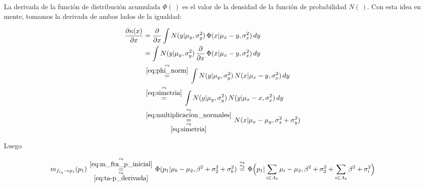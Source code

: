 \documentclass[article]{jss}
\newcommand\hfrac[2]{\genfrac{}{}{0pt}{}{#1}{#2}} %
\begin{document}
\begin{appendix}
La derivada de la funci\'on de distribuci\'on acumulada $\Phi(\,)$ es el valor de la densidad de la funci\'on de probabilidad $N(\,)$. Con esta idea en mente, tomamos la derivada de ambos lados de la igualdad:

\begin{equation}\label{eq:ta-p_derivada}
\begin{split}
\frac{\partial\kappa(x)}{\partial x} &= \frac{\partial}{\partial x} \int  N(y| \mu_y, \sigma_y^2 ) \,   \Phi (x | \mu_x -y , \sigma_x^2 ) \, dy \\
&= \int  N(y| \mu_y, \sigma_y^2 ) \, \frac{\partial}{\partial x} \,\Phi (x| \mu_x - y, \sigma_x^2 )  \, dy   \\
& \overset{\hfrac{\text{eq}}{\ref{eq:phi_norm}}}{=} \int  N(y| \mu_y, \sigma_y^2 ) \, N(x| \mu_x -y , \sigma_x^2)  \, dy  \\
& \overset{\hfrac{\text{eq}}{\ref{eq:simetria}}}{=} \int  N(y| \mu_y, \sigma_y^2 ) \, N(y| \mu_x  -x , \sigma_x^2)  \, dy  \\
&\overset{\hfrac{\text{eq}}{\ref{eq:multiplicacion_normales}}}{\underset{\hfrac{\text{eq}}{\ref{eq:simetria}}}{=}} N(x| \mu_x - \mu_y, \sigma_x^2 + \sigma_y^2)
\end{split}
\end{equation}

Luego

\begin{equation}\label{eq:m_fta_p}
 m_{f_{t_a} \rightarrow p_1}(p_1) \overset{\hfrac{\text{eq}}{\ref{eq:m_fta_p_inicial}}}{\underset{\hfrac{\text{eq}}{\ref{eq:ta-p_derivada}}}{=}}  \Phi(p_1| \mu_b - \mu_2, \beta^2 + \sigma_2^2 + \sigma_b^2)  \overset{\hfrac{\mu_b}{\sigma_b}}{=}  \Phi\Big(p_1| \sum_{i \in A_b} \mu_i - \mu_2, \beta^2 + \sigma_2^2 + \sum_{i \in A_b} \beta^2 + \sigma_i^2 \Big)
\end{equation}


\end{appendix}
\end{document}
